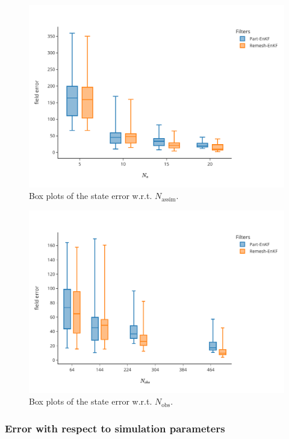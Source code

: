 \begin{figure}[htbp]
	\centering
	\includegraphics[width=0.6\linewidth]{./images/app2d/final/MSE_na_box.pdf}
	\captionsetup{labelformat=empty}
	\caption{Box plots of the state error w.r.t. $N_{\text{assim}}$.}

	\label{fig:na}
\end{figure}

\begin{figure}[htbp]
	\captionsetup{labelformat=empty}
	\centering
	\includegraphics[width=0.6\linewidth]{./images/app2d/final/MSE_nobs_box.pdf}
	\caption{Box plots of the state error w.r.t. $N_{\text{obs}}$.}

	\label{fig:nobs}

	\label{fig:assim_params}
\end{figure}

\subsubsection{Error with respect to simulation parameters}

